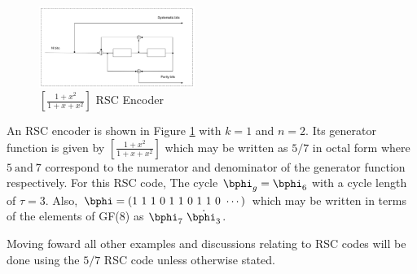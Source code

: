 \begin{figure}[h]
\centering
		\includegraphics[width=0.45\textwidth]{./PaperSources/RSCExample3.pdf}
		\caption{$[\frac{1+x^2}{1+x+x^2}]$  RSC Encoder}
		\label{fig1}
		\end{figure}

\begin{example}		
An RSC encoder is shown in Figure \ref{fig1} with $k=1$ and $n=2$. Its generator function is given by $[\frac{1+x^2}{1+x+x^2}]$ which may be written as $5/7$ in octal form where $5 ~ \text{and} ~ 7$ correspond to the numerator and denominator of the generator function respectively. 
 For this RSC code, The cycle $\bphi_g=\bphi_6 $ with a cycle length of $\tau =3$. Also, $\bphi=(1~1~1~ 0~ 1~ 1~ 0~ 1~ 1~ 0~\cdots)$ which may be written in terms of the elements of GF(8) as $\bphi_7~\dot{\bphi_3}$. 
 \end{example}
  Moving foward all other examples and discussions relating to RSC codes will be done using the $5/7$ RSC code unless otherwise stated.


